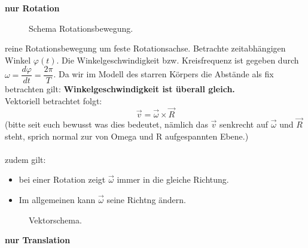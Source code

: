 \documentclass[12pt]{article}
\begin{document}
\textbf{nur Rotation}\\
\begin{figure}[H]
  \caption{Schema Rotationsbewegung.}
  \label{fig:1teil}
\end{figure} 
reine Rotationsbewegung um feste Rotationsachse. Betrachte zeitabhängigen Winkel $\varphi (t)$. Die Winkelgeschwindigkeit bzw. Kreisfrequenz ist gegeben durch $\omega = \dfrac{d \varphi}{dt} = \dfrac{2\pi}{T}$. Da wir im Modell des starren Körpers die Abstände als fix betrachten gilt: \textbf{Winkelgeschwindigkeit ist überall gleich.}\\
Vektoriell betrachtet folgt:
\begin{equation}
\vec{v} = \vec{\omega} \times \vec{R}
\end{equation}
(bitte seit euch bewusst was dies bedeutet, nämlich das $\vec{v}$ senkrecht auf $\vec{\omega}$ und $\vec{R}$ steht, sprich normal zur von Omega und R aufgespannten Ebene.)\\
\\
zudem gilt:
\begin{itemize}
\item bei einer Rotation zeigt $\vec{\omega}$ immer in die gleiche Richtung.
\item Im allgemeinen kann $\vec{\omega}$ seine Richtng ändern.
\end{itemize}

\begin{figure}[H]
  \caption{Vektorschema.}
  \label{fig:1teil}
\end{figure} 

\clearpage

\textbf{nur Translation}
\begin{figure}[H]
  \label{fig:1teil}
\end{figure} 
\end{document}

